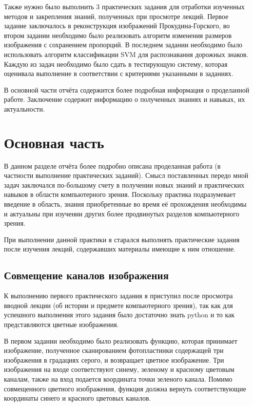 \documentclass[12pt]{article}
\begin{document}
Также нужно было выполнить 3 практических задания для отработки изученных методов и закрепления знаний, полученных при просмотре лекций. Первое задание заключалось в реконструкция изображений Прокудина-Горского, во втором задании необходимо было реализовать алгоритм изменения размеров изображения с сохранением пропорций. В последнем задании необходимо было использовать алгоритм классификации SVM для распознавания дорожных знаков. Каждую из задач необходимо было сдать в тестирующую систему, которая оценивала выполнение в соответствии с критериями указанными в заданиях.



В основной части отчёта содержится более подробная информация о проделанной работе. Заключение содержит информацию о полученных знаниях и навыках, их актуальности.

\newpage

\section*{Основная часть}
%

В данном разделе отчёта более подробно описана проделанная работа (в частности выполнение практических заданий). Смысл поставленных передо мной задач заключался по-большому счету в получении новых знаний и практических навыков в области компьютерного зрения. Поскольку практика подразумевает введение в область, знания приобретенные во время её прохождения необходимы и актуальны при изучении других более продвинутых разделов компьютерного зрения.

При выполнении данной практики я старался выполнять практические задания после изучения лекций, содержавших материалы имеющие к ним отношение.

\subsection*{Совмещение каналов изображения}
%

К выполнению первого практического задания я приступил после просмотра вводной лекции (об истории и предмете компьютерного зрения), так как для успешного выполнения этого задания было достаточно знать python и то как представляются цветные изображения.

В первом задании необходимо было реализовать функцию, которая принимает изображение, полученное сканированием фотопластинки содержащей три изображения в градациях серого, и возвращает цветное изображение. Три изображения на входе соответствуют синему, зеленому и красному цветовым каналам, также на вход подается координата точки зеленого канала. Помимо совмещенного цветного изображения, функция должна вернуть соответствующие координаты синего и красного цветовых каналов.
\end{document}
